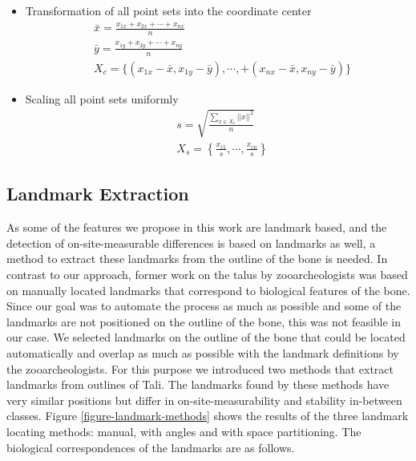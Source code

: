 \documentclass[pdftex,12pt,a4paper]{report}
\begin{document}
\begin{itemize}
	\item Transformation of all point sets into the coordinate center
	\begin{equation}
		\begin{split}
			& \bar{x} = \frac{x_{1x} + x_{2x} + \cdots + x_{nx}}{n} \\
			& \bar{y} = \frac{x_{1y} + x_{2y} + \cdots + x_{ny}}{n} \\
			& X_c = \{ (x_{1x} - \bar{x}, x_{1y} - \bar{y}), \cdots, + (x_{nx} - \bar{x}, x_{ny} - \bar{y}) \}
		\end{split} 
	\end{equation}
	\item Scaling all point sets uniformly
	\begin{equation}
		\begin{split}
			& s = \sqrt{\frac{\sum\limits_{x \in X_c}||x||^2}{n}} \\
			& X_s = \left\{ \frac{x_{c1}}{s}, \cdots, \frac{x_{cn}}{s}\right\}
		\end{split}
	\end{equation}
\end{itemize}

\subsection{Landmark Extraction}
\label{sub:landmarks}

As some of the features we propose in this work are landmark based, and the detection of on-site-measurable differences
is based on landmarks as well, a method to extract these landmarks from the outline of the bone is needed. In contrast to
our approach, former work on the talus by zooarcheologists was based on manually located landmarks that correspond to
biological features of the bone. Since our goal was to automate the process as much as possible and some of the landmarks
are not positioned on the outline of the bone, this was not feasible in our case. We selected landmarks on the outline
of the bone that could be located automatically and overlap as much as possible with the landmark definitions by the
zooarcheologists. For this purpose we introduced two methods that extract landmarks from outlines of Tali. The landmarks
found by these methods have very similar positions but differ in on-site-measurability and stability in-between classes.
Figure \ref{figure-landmark-methods} shows the results of the three landmark locating methods: manual, with angles and
with space partitioning. The biological correspondences of the landmarks are as follows.
\end{document}
